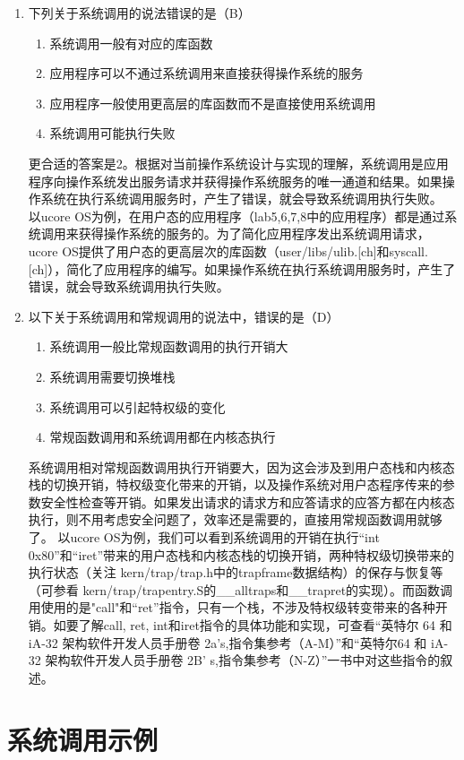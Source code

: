 \begin{enumerate}
\item 下列关于系统调用的说法错误的是（B）


\begin{enumerate}[A]
	\item 系统调用一般有对应的库函数
	\item 应用程序可以不通过系统调用来直接获得操作系统的服务
	\item 应用程序一般使用更高层的库函数而不是直接使用系统调用
	\item 系统调用可能执行失败
\end{enumerate}
更合适的答案是2。根据对当前操作系统设计与实现的理解，系统调用是应用程序向操作系统发出服务请求并获得操作系统服务的唯一通道和结果。如果操作系统在执行系统调用服务时，产生了错误，就会导致系统调用执行失败。 以ucore OS为例，在用户态的应用程序（lab5,6,7,8中的应用程序）都是通过系统调用来获得操作系统的服务的。为了简化应用程序发出系统调用请求，ucore OS提供了用户态的更高层次的库函数（user/libs/ulib.[ch]和syscall.[ch]），简化了应用程序的编写。如果操作系统在执行系统调用服务时，产生了错误，就会导致系统调用执行失败。


\item 以下关于系统调用和常规调用的说法中，错误的是（D）
\begin{enumerate}[A]
	\item 系统调用一般比常规函数调用的执行开销大
	\item 系统调用需要切换堆栈
	\item 系统调用可以引起特权级的变化
	\item 常规函数调用和系统调用都在内核态执行
\end{enumerate}
系统调用相对常规函数调用执行开销要大，因为这会涉及到用户态栈和内核态栈的切换开销，特权级变化带来的开销，以及操作系统对用户态程序传来的参数安全性检查等开销。如果发出请求的请求方和应答请求的应答方都在内核态执行，则不用考虑安全问题了，效率还是需要的，直接用常规函数调用就够了。 以ucore OS为例，我们可以看到系统调用的开销在执行“int 0x80”和“iret”带来的用户态栈和内核态栈的切换开销，两种特权级切换带来的执行状态（关注 kern/trap/trap.h中的trapframe数据结构）的保存与恢复等（可参看 kern/trap/trapentry.S的\_\_alltraps和\_\_trapret的实现）。而函数调用使用的是"call"和“ret”指令，只有一个栈，不涉及特权级转变带来的各种开销。如要了解call, ret, int和iret指令的具体功能和实现，可查看“英特尔 64 和 iA-32 架构软件开发人员手册卷 2a's,指令集参考（A-M）”和“英特尔64 和 iA-32 架构软件开发人员手册卷 2B’ s,指令集参考（N-Z）”一书中对这些指令的叙述。
\end{enumerate}

\section{系统调用示例}
